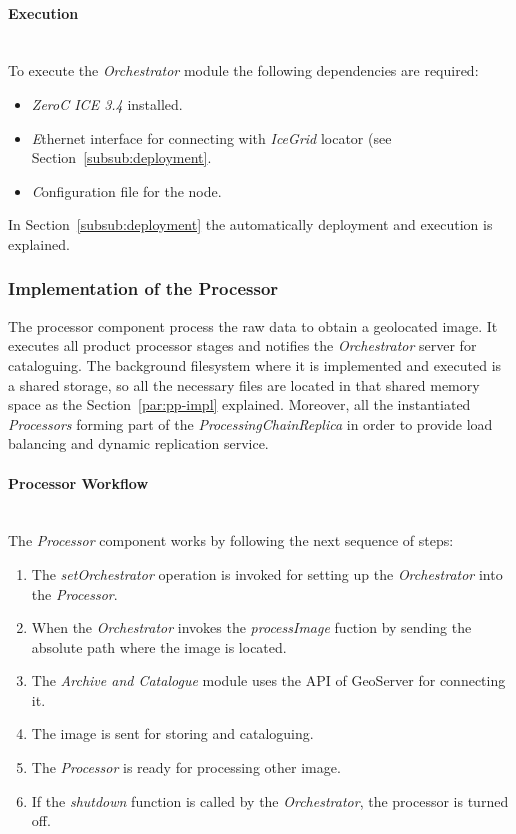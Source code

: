 \paragraph{Execution}~\\

To execute the \emph{Orchestrator} module the following dependencies
are required:
\begin{itemize}
\item \emph{ZeroC ICE 3.4} installed.
\item \emph Ethernet interface for connecting with \emph{IceGrid} locator (see Section~\ref{subsub:deployment}.
\item \emph Configuration file for the node.
\end{itemize}
 In Section~\ref{subsub:deployment} the
  automatically deployment and execution is explained. 

\subsubsection{Implementation of the  Processor}

The processor component process the raw data to obtain a
geolocated image. It executes all product processor stages and notifies the
\emph{Orchestrator} server for cataloguing. The background filesystem where it
is implemented and executed is a shared storage, so all the necessary files are
located in that shared memory space as the Section~\ref{par:pp-impl}
explained. Moreover, all the instantiated \emph{Processors} forming part of the
\emph{ProcessingChainReplica} in order to provide load balancing and dynamic
replication service. 


\paragraph{ Processor Workflow}~\\

The \emph{Processor} component works by following the next sequence of steps:

\begin{enumerate}
\item The \emph{setOrchestrator} operation is invoked for setting up the
  \emph{Orchestrator} into the \emph{Processor}.
\item When the \emph{Orchestrator} invokes the \emph{processImage} fuction by sending
  the absolute path where the image is located.
\item The \emph{Archive and Catalogue} module uses the \ac{API} of GeoServer for
  connecting it.
\item The image is sent for storing and cataloguing.
\item The \emph{Processor} is ready for processing other image.
\item If the \emph{shutdown} function is called by the \emph{Orchestrator}, the
  processor is turned off.
\end{enumerate}



